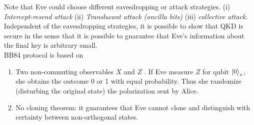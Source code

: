 \documentclass[]{book}
\theoremstyle{nonumberplain}
\begin{document}
Note that Eve could choose different eavesdropping or attack strategies. (i) \emph{Intercept-resend attack} (ii) \emph{Translucant attack (ancilla bits)} (iii) \emph{collective attack}. Independent of the eavesdropping strategies, it is possible to show that QKD is secure in the sense that it is possible to guarantee that Eve's information about the final key is arbitrary small. \\

BB84 protocol is based on 
\begin{enumerate}
    \item Two non-commuting observables $X$ and $Z$ . If Eve measure $Z$ for qubit $\ket{0}_{x}$, she obtains the outcome 0 or 1 with equal probability. Thus she randomize (disturbing the original state) the polarization sent by Alice. 
    \item No cloning theorem: it guarantees that Eve cannot clone and distinguish with certainty between non-orthogonal states. 
\end{enumerate}
\end{document}
